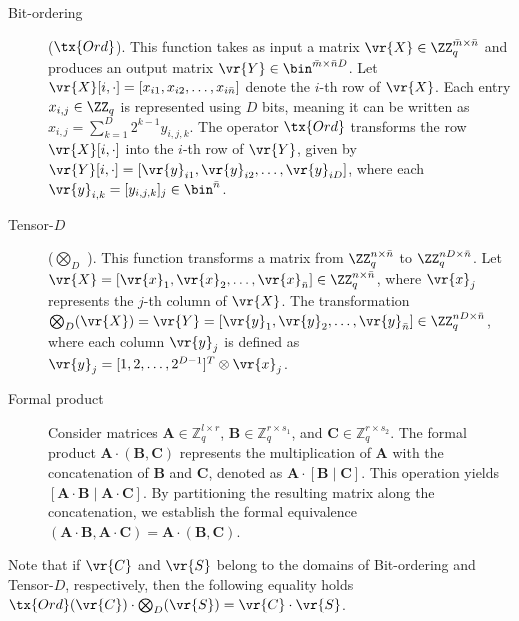 \documentclass{fundam}
\begin{document}
\begin{description}
	
	\item[{Bit-ordering}] {($\tx{Ord}$)}. This function takes as input a matrix $\vr{X}\in \ZZ_{q}^{\bar{m}\times \bar{n}}$ and produces an output matrix  $\vr{Y}\in \bin^{\bar{m}\times \bar{n}D}$. Let $\vr{X}[i,\cdot]=[{x}_{i1}, {x}_{i2}, \ldots , {x}_{i\bar{n}}]$ denote the $i$-th row of $\vr{X}$. Each entry ${x}_{i,j}\in\ZZ_{q}$ is represented using $D$ bits, meaning it can be written as ${x}_{i,j}=\sum_{k=1}^{D}2^{k-1}y_{i,j,k}$. The operator $\tx{Ord}$ transforms the row $\vr{X}[i,\cdot]$ into the $i$-th row of $\vr{Y}$, given by $\vr{Y}[i,\cdot]=[\vr{y}_{i1}, \vr{y}_{i2}, \ldots , \vr{y}_{iD}]$, where each $\vr{y}_{i,k}=[y_{i,j,k}]_{j}\in\bin^{\bar{n}}$.
	
	\item[Tensor-$D$] ($\bigotimes_{D}$  ). This function transforms a matrix from $\ZZ_{q}^{n\times \bar{n}}$ to $\ZZ_{q}^{nD\times \bar{n}}$. Let $\vr{X} =[\vr{x}_{1}, \vr{x}_{2}, \ldots , \vr{x}_{\bar{n}}]\in \ZZ_{q}^{n\times \bar{n}}$, where $\vr{x}_{j}$ represents the $j$-th column of $\vr{X}$. The transformation $\bigotimes_{D}(\vr{X}) = \vr{Y}=[\vr{y}_{1}, \vr{y}_{2}, \ldots , \vr{y}_{\bar{n}}]\in \ZZ_{q}^{nD\times \bar{n}}$, where each column $\vr{y}_{j}$ is defined as $\vr{y}_{j}=[1, 2, \ldots , 2^{D-1}]^{T}\otimes \vr{x}_{j}$.
	
	\item[Formal product] Consider matrices $\mathbf{A} \in \mathbb{Z}_q^{l \times r}$, $\mathbf{B} \in \mathbb{Z}_q^{r \times s_1}$, and $\mathbf{C} \in \mathbb{Z}_q^{r \times s_2}$. The formal product $\mathbf{A} \cdot (\mathbf{B}, \mathbf{C})$ represents the multiplication of $\mathbf{A}$ with the concatenation of $\mathbf{B}$ and $\mathbf{C}$, denoted as $\mathbf{A} \cdot [\mathbf{B} \mid \mathbf{C}]$. This operation yields $[\mathbf{A} \cdot \mathbf{B} \mid \mathbf{A} \cdot \mathbf{C}]$. By partitioning the resulting matrix along the concatenation, we establish the formal equivalence $(\mathbf{A} \cdot \mathbf{B}, \mathbf{A} \cdot \mathbf{C}) = \mathbf{A} \cdot (\mathbf{B}, \mathbf{C})$.
\end{description}


\begin{remark}
Note that if $\vr{C}$ and $\vr{S}$ belong to the domains of Bit-ordering and Tensor-$D$, respectively, then the following equality holds
$\tx{Ord}(\vr{C})\cdot \bigotimes_{D} (\vr{S}) = \vr{C}\cdot \vr{S}$.
\end{remark}	
\end{document}
